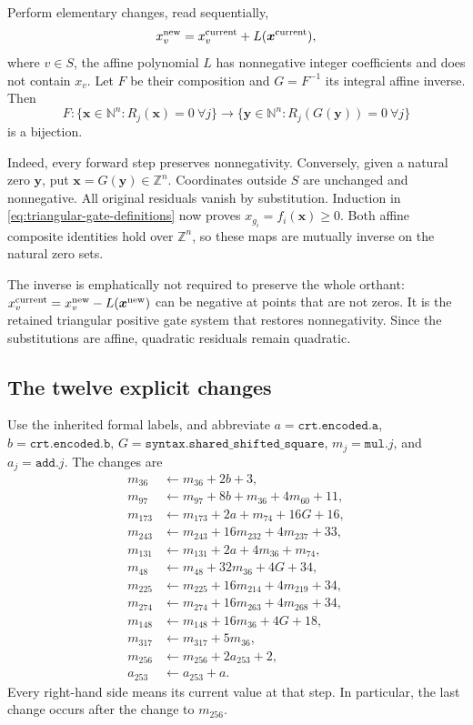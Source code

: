 Perform elementary changes, read sequentially,
\begin{equation}
 x_v^{\rm new}=x_v^{\rm current}+L(\boldsymbol x^{\rm current}),
 \label{eq:nonnegative-affine-shear}
\end{equation}
where $v\in S$, the affine polynomial $L$ has nonnegative integer
coefficients and does not contain $x_v$.  Let $F$ be their composition and
$G=F^{-1}$ its integral affine inverse.  Then
\begin{equation}
 F:\{\boldsymbol x\in\mathbb N^n:R_j(\boldsymbol x)=0\ \forall j\}
 \longrightarrow
 \{\boldsymbol y\in\mathbb N^n:R_j(G(\boldsymbol y))=0\ \forall j\}
 \label{eq:natural-chart-bijection}
\end{equation}
is a bijection.

Indeed, every forward step preserves nonnegativity.  Conversely, given a
natural zero $\boldsymbol y$, put $\boldsymbol x=G(\boldsymbol y)\in
\mathbb Z^n$.  Coordinates outside $S$ are unchanged and nonnegative.
All original residuals vanish by substitution.  Induction in
\eqref{eq:triangular-gate-definitions} now proves $x_{g_i}=f_i(\boldsymbol
x)\geq0$.  Both affine composite identities hold over $\mathbb Z^n$, so
these maps are mutually inverse on the natural zero sets.

The inverse is emphatically not required to preserve the whole orthant:
$x_v^{\rm current}=x_v^{\rm new}-L(\boldsymbol x^{\rm new})$ can be
negative at points that are not zeros.  It is the retained triangular
positive gate system that restores nonnegativity.  Since the substitutions
are affine, quadratic residuals remain quadratic.

\subsection{The twelve explicit changes}

Use the inherited formal labels, and abbreviate
$a=\texttt{crt.encoded.a}$, $b=\texttt{crt.encoded.b}$,
$G=\texttt{syntax.shared\_shifted\_square}$,
$m_j=\texttt{mul.}j$, and $a_j=\texttt{add.}j$.  The changes are
\begin{align*}
 m_{36}&\gets m_{36}+2b+3,\\
 m_{97}&\gets m_{97}+8b+m_{36}+4m_{60}+11,\\
 m_{173}&\gets m_{173}+2a+m_{74}+16G+16,\\
 m_{243}&\gets m_{243}+16m_{232}+4m_{237}+33,\\
 m_{131}&\gets m_{131}+2a+4m_{36}+m_{74},\\
 m_{48}&\gets m_{48}+32m_{36}+4G+34,\\
 m_{225}&\gets m_{225}+16m_{214}+4m_{219}+34,\\
 m_{274}&\gets m_{274}+16m_{263}+4m_{268}+34,\\
 m_{148}&\gets m_{148}+16m_{36}+4G+18,\\
 m_{317}&\gets m_{317}+5m_{36},\\
 m_{256}&\gets m_{256}+2a_{253}+2,\\
 a_{253}&\gets a_{253}+a.
\end{align*}
Every right-hand side means its current value at that step.  In particular,
the last change occurs after the change to $m_{256}$.

